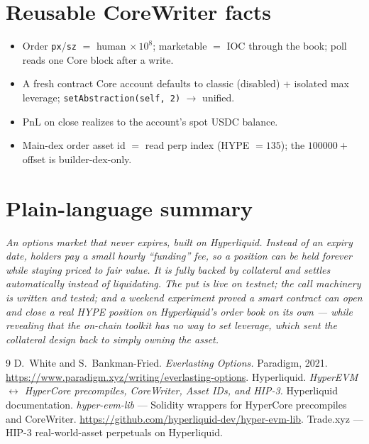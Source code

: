 \documentclass[11pt]{article}
\newcommand{\code}[1]{\texttt{\small #1}}
\begin{document}
\section{Reusable CoreWriter facts}
\begin{itemize}[leftmargin=1.4em,itemsep=2pt]
  \item Order \code{px}/\code{sz} $=$ human $\times\,10^{8}$; marketable $=$ IOC through the book;
        poll reads one Core block after a write.
  \item A fresh contract Core account defaults to classic (disabled) + isolated max leverage;
        \code{setAbstraction(self, 2)} $\to$ unified.
  \item PnL on close realizes to the account's spot USDC balance.
  \item Main-dex order asset id $=$ read perp index (HYPE $=135$); the $100000+$ offset is
        builder-dex-only.
\end{itemize}

\section{Plain-language summary}
\emph{An options market that never expires, built on Hyperliquid. Instead of an expiry date, holders
pay a small hourly ``funding'' fee, so a position can be held forever while staying priced to fair
value. It is fully backed by collateral and settles automatically instead of liquidating. The put is
live on testnet; the call machinery is written and tested; and a weekend experiment proved a smart
contract can open and close a real HYPE position on Hyperliquid's order book on its own --- while
revealing that the on-chain toolkit has no way to set leverage, which sent the collateral design back
to simply owning the asset.}

\begin{thebibliography}{9}
 D.~White and S.~Bankman-Fried.
  \emph{Everlasting Options.} Paradigm, 2021.
  \url{https://www.paradigm.xyz/writing/everlasting-options}.
 Hyperliquid.
  \emph{HyperEVM $\leftrightarrow$ HyperCore precompiles, CoreWriter, Asset IDs, and HIP-3.}
  Hyperliquid documentation.
 \emph{hyper-evm-lib} --- Solidity wrappers for HyperCore precompiles and
  CoreWriter. \url{https://github.com/hyperliquid-dev/hyper-evm-lib}.
 Trade.xyz --- HIP-3 real-world-asset perpetuals on Hyperliquid.
\end{thebibliography}
\end{document}
